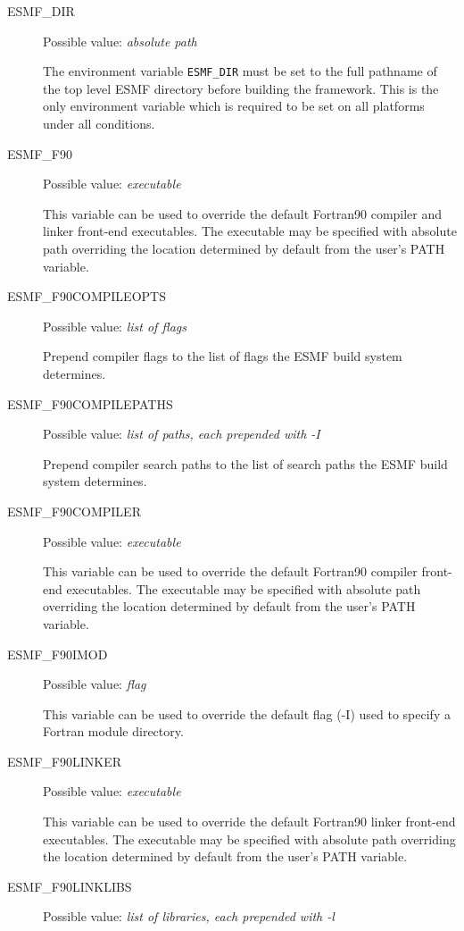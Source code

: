 \begin{description}
\item[ESMF\_DIR]
Possible value: {\em absolute path}

The environment variable {\tt ESMF\_DIR} must be set to the full pathname
of the top level ESMF directory before building the framework. This is the
only environment variable which is required to be set on all platforms under
all conditions.

\item[ESMF\_F90]
Possible value: {\em executable}

This variable can be used to override the default Fortran90 compiler and linker
front-end executables. The executable may be specified with absolute path
overriding the location determined by default from the user's PATH variable.

\item[ESMF\_F90COMPILEOPTS]
Possible value: {\em list of flags}

Prepend compiler flags to the list of flags the ESMF build system determines.

\item[ESMF\_F90COMPILEPATHS]
Possible value: {\em list of paths, each prepended with -I}

Prepend compiler search paths to the list of search paths the ESMF build system
determines.

\item[ESMF\_F90COMPILER]
Possible value: {\em executable}

This variable can be used to override the default Fortran90 compiler
front-end executables. The executable may be specified with absolute path
overriding the location determined by default from the user's PATH variable.

\item[ESMF\_F90IMOD]
Possible value: {\em flag}

This variable can be used to override the default flag (-I) used to specify a
Fortran module directory.

\item[ESMF\_F90LINKER]
Possible value: {\em executable}

This variable can be used to override the default Fortran90 linker
front-end executables. The executable may be specified with absolute path
overriding the location determined by default from the user's PATH variable.

\item[ESMF\_F90LINKLIBS]
Possible value: {\em list of libraries, each prepended with -l}


\end{description}
